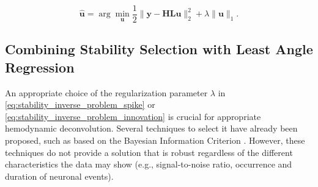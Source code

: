 \begin{equation}
    \mathbf{\hat{u}} = \arg \min_{\mathbf{u}} \frac{1}{2} \|\mathbf{y} - \mathbf{HLu}\|_2^2 + \lambda \|\mathbf{u}\|_1.
    \label{eq:stability_inverse_problem_innovation}
\end{equation}


\subsection{Combining Stability Selection with Least Angle Regression}

An appropriate choice of the regularization parameter $\lambda$ in
\cref{eq:stability_inverse_problem_spike} or
\cref{eq:stability_inverse_problem_innovation} is crucial for appropriate hemodynamic deconvolution. Several techniques to select it have already been proposed, such as based on the
Bayesian Information Criterion \citep{Gaudes2013Paradigmfreemapping}. However,
these techniques do not provide a solution that is robust regardless
of the different characteristics the data may show (e.g., signal-to-noise ratio,
occurrence and duration of neuronal events). 

